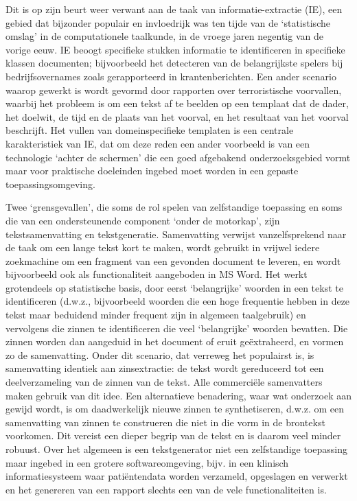 \documentclass[]{../../metanetpaper}
\begin{document}
\begin{multicols}{2}

    Dit is op zijn beurt weer verwant aan de taak van informatie-extractie (IE), een gebied dat bijzonder populair en invloedrijk was ten tijde van de `statistische omslag' in de computationele taalkunde, in de vroege jaren negentig van de vorige eeuw. IE beoogt specifieke stukken informatie te identificeren in specifieke klassen documenten; bijvoorbeeld het detecteren van de belangrijkste spelers bij bedrijfsovernames zoals gerapporteerd in krantenberichten. Een ander scenario waarop gewerkt is wordt gevormd door rapporten over terroristische voorvallen, waarbij het probleem is om een tekst af te beelden op een templaat dat de dader, het doelwit, de tijd en de plaats van het voorval, en het resultaat van het voorval beschrijft. Het vullen van domeinspecifieke templaten is een centrale karakteristiek van IE, dat om deze reden een ander voorbeeld is van een technologie `achter de schermen' die een goed afgebakend onderzoeksgebied vormt maar voor praktische doeleinden ingebed moet worden in een gepaste toepassingsomgeving.

    Twee `grensgevallen', die soms de rol spelen van zelfstandige toepassing en soms die van een ondersteunende component `onder de motorkap', zijn tekstsamenvatting en tekstgeneratie. Samenvatting verwijst vanzelfsprekend naar de taak om een lange tekst kort te maken, wordt gebruikt in vrijwel iedere zoekmachine om een fragment van een gevonden document te leveren, en wordt bijvoorbeeld ook als functionaliteit aangeboden in MS Word. Het werkt grotendeels op statistische basis, door eerst `belangrijke' woorden in een tekst te identificeren (d.w.z., bijvoorbeeld woorden die een hoge frequentie hebben in deze tekst maar beduidend minder frequent zijn in algemeen taalgebruik) en vervolgens die zinnen te identificeren die veel `belangrijke' woorden bevatten. Die zinnen worden dan aangeduid in het document of eruit ge{\"e}xtraheerd, en vormen zo de samenvatting. Onder dit scenario, dat verreweg het populairst is, is samenvatting identiek aan zinsextractie: de tekst wordt gereduceerd tot een deelverzameling van de zinnen van de tekst. Alle commerci{\"e}le samenvatters maken gebruik van dit idee. Een alternatieve benadering, waar wat onderzoek aan gewijd wordt, is om daadwerkelijk nieuwe zinnen te synthetiseren, d.w.z. om een samenvatting van zinnen te construeren die niet in die vorm in de brontekst voorkomen. Dit vereist een dieper begrip van de tekst en is daarom veel minder robuust. Over het algemeen is een tekstgenerator niet een zelfstandige toepassing maar ingebed in een grotere softwareomgeving, bijv. in een klinisch informatiesysteem waar pati{\"e}ntendata worden verzameld, opgeslagen en verwerkt en het genereren van een rapport slechts een van de vele functionaliteiten is.


\end{multicols}
\end{document}
